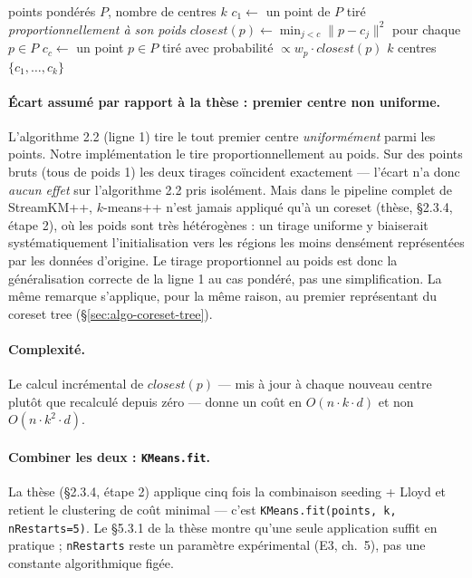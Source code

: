 \begin{algorithm}[H]
\caption{Seeding $D^2$ pondéré (thèse, algo. 2.2 lignes 1--3 --- \texttt{KMeans.seedPlusPlus})}
\begin{algorithmic}[1]
\Require points pondérés $P$, nombre de centres $k$
\State $c_1 \gets$ un point de $P$ tiré \emph{proportionnellement à son poids} 
  \State $\mathit{closest}(p) \gets \min_{j<c} \lVert p - c_j\rVert^2$ pour chaque $p \in P$
  \State $c_c \gets$ un point $p \in P$ tiré avec probabilité $\propto w_p \cdot \mathit{closest}(p)$
\EndFor
\Ensure $k$ centres $\{c_1,\dots,c_k\}$
\end{algorithmic}
\end{algorithm}

\paragraph{Écart assumé par rapport à la thèse : premier centre non uniforme.}
L'algorithme 2.2 (ligne 1) tire le tout premier centre \emph{uniformément}
parmi les points. Notre implémentation le tire proportionnellement au poids.
Sur des points bruts (tous de poids 1) les deux tirages coïncident
exactement --- l'écart n'a donc \emph{aucun effet} sur l'algorithme 2.2 pris
isolément. Mais dans le pipeline complet de StreamKM++, $k$-means++ n'est
jamais appliqué qu'à un coreset (thèse, §2.3.4, étape 2), où les poids sont
très hétérogènes : un tirage uniforme y biaiserait systématiquement
l'initialisation vers les régions les moins densément représentées par les
données d'origine. Le tirage proportionnel au poids est donc la
généralisation correcte de la ligne 1 au cas pondéré, pas une simplification.
La même remarque s'applique, pour la même raison, au premier représentant du
coreset tree (§\ref{sec:algo-coreset-tree}).

\paragraph{Complexité.} Le calcul incrémental de $\mathit{closest}(p)$ --- mis
à jour à chaque nouveau centre plutôt que recalculé depuis zéro --- donne un
coût en $O(n \cdot k \cdot d)$ et non $O(n \cdot k^2 \cdot d)$.

\paragraph{Combiner les deux : \texttt{KMeans.fit}.} La thèse (§2.3.4,
étape 2) applique cinq fois la combinaison seeding + Lloyd et retient le
clustering de coût minimal --- c'est \texttt{KMeans.fit(points, k, nRestarts=5)}.
Le §5.3.1 de la thèse montre qu'une seule application suffit en pratique ;
\texttt{nRestarts} reste un paramètre expérimental (E3, ch.~5), pas une
constante algorithmique figée.

